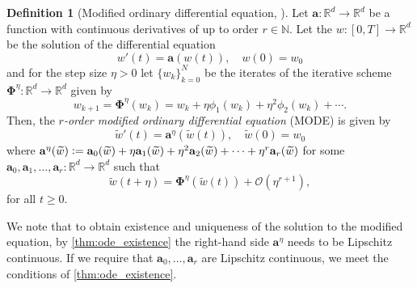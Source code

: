 \documentclass[12pt]{article}
\theoremstyle{definition}
\newtheorem{definition}[definition]{Definition}
\numberwithin{equation}{section}
\newcommand{\N}{\mathbb{N}}
\newcommand{\R}{\mathbb{R}}
\newcommand{\CO}{\mathcal{O}}
\newcommand{\defeq}{\vcentcolon=}
\begin{document}
\begin{definition}[Modified ordinary differential equation, ]
  Let $\mathbf{a}: \R^d \rightarrow \R^d$ be a function with continuous derivatives of up to order $r \in \N$. Let the $w:[0,T] \rightarrow \R^d$ be the solution of the differential equation
  \begin{equation*}
    w'(t) = \mathbf{a}(w(t)), \quad w(0) = w_0
  \end{equation*}
  and for the step size $\eta > 0$ let $\{w_k\}_{k=0}^N$ be the iterates of the iterative scheme $\mathbf{\Phi}^\eta : \R^d \rightarrow \R^d$ given by
  \begin{equation*}
    w_{k+1} = \mathbf{\Phi}^\eta(w_k) = w_k + \eta \phi_1(w_k) + \eta^2 \phi_2(w_k) + \cdots.
  \end{equation*}
  Then, the \emph{$r$-order modified ordinary differential equation} (MODE) is given by
  \begin{equation}
    \label{eq:modified_ode}
    \widetilde{w}'(t) = \mathbf{a}^\eta(\widetilde{w}(t)), \quad \widetilde{w}(0) = w_0
  \end{equation}
  where $\mathbf{a}^\eta(\widetilde{w}) \defeq \mathbf{a}_0(\widetilde{w}) + \eta\mathbf{a}_1(\widetilde{w}) + \eta^2\mathbf{a}_2(\widetilde{w})+\cdots + \eta^r\mathbf{a}_r(\widetilde{w})$
  for some $\mathbf{a}_0, \mathbf{a}_1, \dots, \mathbf{a}_r : \R^d \rightarrow \R^d$ such that 
  \begin{equation*}
    \widetilde{w}(t+\eta) = \mathbf{\Phi}^\eta(\widetilde{w}(t)) + \CO(\eta^{r+1}),
  \end{equation*}
  for all $t \geq 0$.
\end{definition}
We note that to obtain existence and uniqueness of the solution to the modified equation, by \autoref{thm:ode_existence} the right-hand side $\mathbf{a}^\eta$ needs to be Lipschitz continuous. If we require that $\mathbf{a}_0, \dots, \mathbf{a}_r$ are Lipschitz continuous, we meet the conditions of \autoref{thm:ode_existence}.
\end{document}
